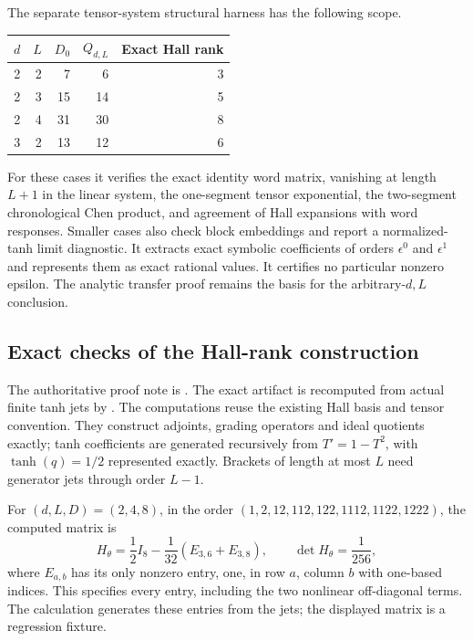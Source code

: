 \documentclass[11pt,a4paper]{article}
\numberwithin{equation}{section}
\theoremstyle{definition}
\theoremstyle{remark}
\begin{document}
The separate tensor-system structural harness has the following scope.
\begin{center}
\begin{tabular}{@{}rrrrr@{}}
\toprule
$d$ & $L$ & $D_0$ & $Q_{d,L}$ & Exact Hall rank \\
\midrule
2&2&7&6&3\\
2&3&15&14&5\\
2&4&31&30&8\\
3&2&13&12&6\\
\bottomrule
\end{tabular}
\end{center}
For these cases it verifies the exact identity word matrix, vanishing at
length $L+1$ in the linear system, the one-segment tensor exponential,
the two-segment chronological Chen product, and agreement of Hall
expansions with word responses. Smaller cases also check block embeddings
and report a normalized-tanh limit diagnostic. It extracts exact symbolic
coefficients of orders $\epsilon^0$ and $\epsilon^1$ and represents them
as exact rational values. It certifies no particular nonzero epsilon.
The analytic transfer proof remains the basis for the arbitrary-$d,L$
conclusion.

\subsection{Exact checks of the Hall-rank construction}
The authoritative proof note is
.
The exact artifact
is recomputed from actual finite tanh jets by
.
The computations reuse the existing Hall basis and tensor convention.
They construct adjoints, grading operators and ideal quotients exactly;
tanh coefficients are generated recursively from $T'=1-T^2$, with
$\tanh(q)=1/2$ represented exactly. Brackets of length at most $L$
need generator jets through order $L-1$.

For $(d,L,D)=(2,4,8)$, in the order
$(1,2,12,112,122,1112,1122,1222)$, the computed matrix is
\begin{equation}\label{eq:hallregression}
 H_\theta=\frac12 I_8-\frac1{32}(E_{3,6}+E_{3,8}),
 \qquad \det H_\theta=\frac1{256},
\end{equation}
where $E_{a,b}$ has its only nonzero entry, one, in row $a$, column $b$
with one-based indices. This specifies every entry, including the two
nonlinear off-diagonal terms. The calculation generates these entries
from the jets; the displayed matrix is a regression fixture.
\end{document}
